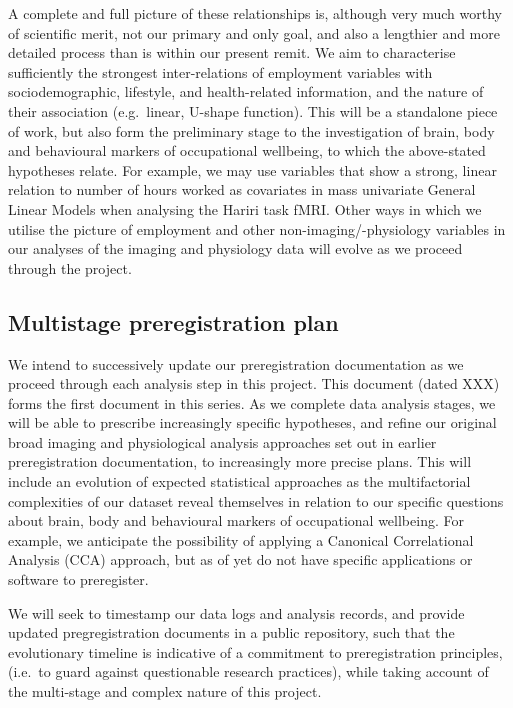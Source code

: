\documentclass[
  english,
  man, donotrepeattitle]{apa6}
\begin{document}
A complete and full picture of these relationships is, although very much worthy of scientific merit, not our primary and only goal, and also a lengthier and more detailed process than is within our present remit. We aim to characterise sufficiently the strongest inter-relations of employment variables with sociodemographic, lifestyle, and health-related information, and the nature of their association (e.g.~linear, U-shape function). This will be a standalone piece of work, but also form the preliminary stage to the investigation of brain, body and behavioural markers of occupational wellbeing, to which the above-stated hypotheses relate. For example, we may use variables that show a strong, linear relation to number of hours worked as covariates in mass univariate General Linear Models when analysing the Hariri task fMRI. Other ways in which we utilise the picture of employment and other non-imaging/-physiology variables in our analyses of the imaging and physiology data will evolve as we proceed through the project.

\newpage

\hypertarget{multistage-preregistration-plan}{%
\subsection{Multistage preregistration plan}\label{multistage-preregistration-plan}}

We intend to successively update our preregistration documentation as we proceed through each analysis step in this project. This document (dated XXX) forms the first document in this series. As we complete data analysis stages, we will be able to prescribe increasingly specific hypotheses, and refine our original broad imaging and physiological analysis approaches set out in earlier preregistration documentation, to increasingly more precise plans. This will include an evolution of expected statistical approaches as the multifactorial complexities of our dataset reveal themselves in relation to our specific questions about brain, body and behavioural markers of occupational wellbeing. For example, we anticipate the possibility of applying a Canonical Correlational Analysis (CCA) approach, but as of yet do not have specific applications or software to preregister.

We will seek to timestamp our data logs and analysis records, and provide updated pregregistration documents in a public repository, such that the evolutionary timeline is indicative of a commitment to preregistration principles, (i.e.~to guard against questionable research practices), while taking account of the multi-stage and complex nature of this project.
\end{document}
